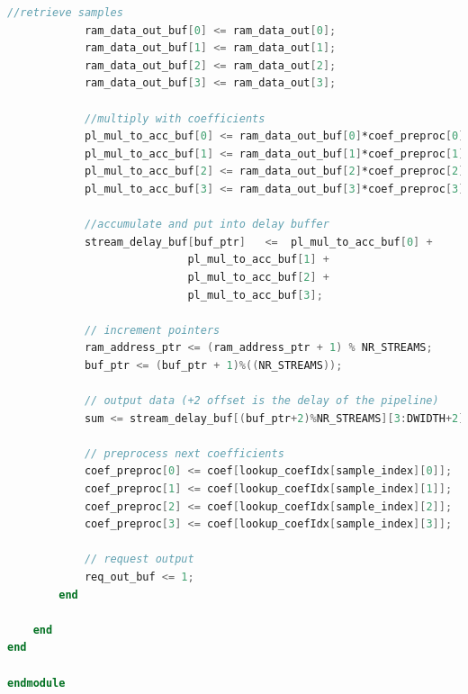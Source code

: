 \documentclass[a4paper,twoside,11pt, fleqn]{article}
\begin{document}
\begin{lstlisting}[language=Verilog]
            //retrieve samples
            ram_data_out_buf[0] <= ram_data_out[0];
            ram_data_out_buf[1] <= ram_data_out[1];
            ram_data_out_buf[2] <= ram_data_out[2];
            ram_data_out_buf[3] <= ram_data_out[3];

            //multiply with coefficients
            pl_mul_to_acc_buf[0] <= ram_data_out_buf[0]*coef_preproc[0];
            pl_mul_to_acc_buf[1] <= ram_data_out_buf[1]*coef_preproc[1];
            pl_mul_to_acc_buf[2] <= ram_data_out_buf[2]*coef_preproc[2];
            pl_mul_to_acc_buf[3] <= ram_data_out_buf[3]*coef_preproc[3];

            //accumulate and put into delay buffer
            stream_delay_buf[buf_ptr]	<= 	pl_mul_to_acc_buf[0] +
                            pl_mul_to_acc_buf[1] +
                            pl_mul_to_acc_buf[2] +
                            pl_mul_to_acc_buf[3];

            // increment pointers
            ram_address_ptr <= (ram_address_ptr + 1) % NR_STREAMS;
            buf_ptr <= (buf_ptr + 1)%((NR_STREAMS));

            // output data (+2 offset is the delay of the pipeline)
            sum <= stream_delay_buf[(buf_ptr+2)%NR_STREAMS][3:DWIDTH+2];

            // preprocess next coefficients
            coef_preproc[0] <= coef[lookup_coefIdx[sample_index][0]];
            coef_preproc[1] <= coef[lookup_coefIdx[sample_index][1]];
            coef_preproc[2] <= coef[lookup_coefIdx[sample_index][2]];
            coef_preproc[3] <= coef[lookup_coefIdx[sample_index][3]];

            // request output
            req_out_buf <= 1;
        end

    end
end

endmodule
\end{lstlisting}

\newpage
\end{document}
